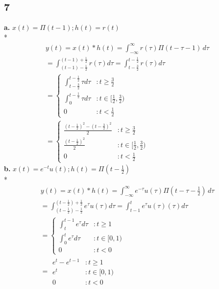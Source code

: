 \documentclass[10pt, letterpaper]{article}
\begin{document}
\subsection*{7}
\textbf{a.} 
$x(t) = \Pi ( t - 1); h(t) = r(t)$ \\*
\begin{align*}
	y(t) = x(t) * h(t) = \int_{-\infty}^{\infty} r(\tau) \Pi (t - \tau - 1) \, d\tau \\
	= \int_{(t - 1) - \frac{1}{2}}^{(t - 1) + \frac{1}{2}}r(\tau) d\tau
	= \int_{t - \frac{3}{2}}^{t - \frac{1}{2}}r(\tau) d\tau \\
           = \left\{
  		\begin{array}{lr}
		    \int_{t - \frac{3}{2}}^{t - \frac{1}{2}}\tau d\tau & : t\geq \frac{3}{2} \\
		    \int_{0}^{t - \frac{1}{2}}\tau d\tau & : t \in [\frac{1}{2}, \frac{3}{2})\\
	              0 & : t < \frac{1}{2}
		  \end{array}
	\right. \\
	=
	\boxed{
          	\left\{
  		\begin{array}{lr}
		    \frac{(t - \frac{1}{2})^2 - (t - \frac{3}{2})^2}{2} & : t \geq \frac{3}{2} \\
		    \frac{(t - \frac{1}{2})^2}{2} & : t \in [\frac{1}{2}, \frac{3}{2})\\
	              0 & : t < \frac{1}{2}
		  \end{array}
	\right.
	}
\end{align*}
\textbf{b.}
$x(t) = e^{-t}u(t); h(t) = \Pi (t - \frac{1}{2})$\\*
\begin{align*}
	y(t) = x(t) * h(t) = \int_{-\infty}^{\infty} e^{-\tau}u(\tau) \Pi (t - \tau - \frac{1}{2}) \, d\tau \\
	= \int_{(t - \frac{1}{2}) - \frac{1}{2}}^{(t - \frac{1}{2}) + \frac{1}{2}}e^\tau u(\tau) d\tau
	= \int_{t - 1}^{t}e^\tau u(\tau)(\tau) d\tau \\
           = \left\{
  		\begin{array}{lr}
		    \int_{t}^{t - 1}e^\tau  d\tau & : t\geq 1 \\
		    \int_{0}^{t}e^\tau d\tau & : t \in [0, 1)\\
	              0 & : t < 0
		  \end{array}
	\right. \\	
	=
	\boxed{
	\begin{array}{lr}
		    e^t - e^{t - 1} & : t\geq 1 \\
		    e^t & : t \in [0, 1)\\
	              0 & : t < 0
	 \end{array}
	}
\end{align*}
\end{document}
